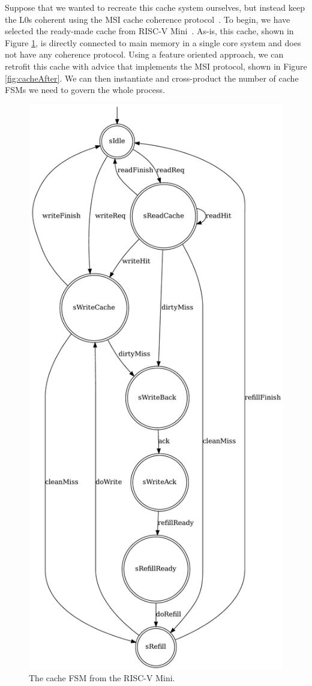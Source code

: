 \documentclass[sigplan,anonymous,review]{acmart}
\begin{document}
Suppose that we wanted to recreate this cache system ourselves, but instead keep the L0s coherent using the MSI cache coherence protocol~\cite{}. To begin, we have selected the ready-made cache from RISC-V Mini~\cite{}. As-is, this cache, shown in Figure \ref{fig:cacheBefore}, is directly connected to main memory in a single core system and does not have any coherence protocol. Using a feature oriented approach, we can retrofit this cache with advice that implements the MSI protocol, shown in Figure \ref{fig:cacheAfter}. We can then instantiate and cross-product the number of cache FSMs we need to govern the whole process. 

\begin{figure}
    \centering
    \includegraphics[width=0.7\linewidth]{figures/cacheFSM.pdf}
    \caption{The cache FSM from the RISC-V Mini.}
    \label{fig:cacheBefore}
\end{figure}
\end{document}
